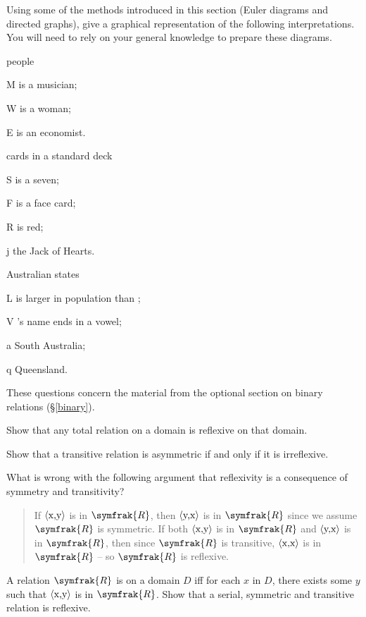 \begin{earg}
\problempart
Using some of the methods introduced in this section (Euler diagrams and directed graphs), give a graphical representation of the following interpretations. You will need to rely on your general knowledge to prepare these diagrams. \begin{earg}
	\item \begin{ekey}
		\item[\domain] people
		\item[M]  is a musician;
		\item[W]  is a woman;
		\item[E]  is an economist.
	\end{ekey}
	\item \begin{ekey}
\item[\domain] cards in a standard deck
\item[S]  is a seven;
\item[F]  is a face card;
\item[R]  is red;
\item[j] the Jack of Hearts.
	\end{ekey}
	\item \begin{ekey}
		\item[\domain] Australian states
		\item[L]  is larger in population than \gap{2};
		\item[V] 's name ends in a vowel;
		\item[a] South Australia;
		\item[q] Queensland.
	\end{ekey}
\end{earg}

\problempart These questions concern the material from the optional section on binary relations (§\ref{binary}). \begin{earg} \item Show that any total relation on a domain is reflexive on that domain.
\item Show that a transitive relation is asymmetric if and only if it is irreflexive.
\item What is wrong with the following argument that reflexivity is a consequence of symmetry and transitivity? \begin{quote}
	If $\mbox{\ensuremath{\mathopen{\langle}}x,y\ensuremath{\mathclose{\rangle}}}$ is in $\symfrak{R}$, then $\mbox{\ensuremath{\mathopen{\langle}}y,x\ensuremath{\mathclose{\rangle}}}$ is in $\symfrak{R}$ since we assume $\symfrak{R}$ is symmetric. If both $\mbox{\ensuremath{\mathopen{\langle}}x,y\ensuremath{\mathclose{\rangle}}}$ is in $\symfrak{R}$ and $\mbox{\ensuremath{\mathopen{\langle}}y,x\ensuremath{\mathclose{\rangle}}}$ is in $\symfrak{R}$, then since $\symfrak{R}$ is transitive, $\mbox{\ensuremath{\mathopen{\langle}}x,x\ensuremath{\mathclose{\rangle}}}$ is in $\symfrak{R}$ – so $\symfrak{R}$ is reflexive. 
\end{quote}
\item A relation $\symfrak{R}$ is  on a domain $D$ iff for each $x$ in $D$, there exists some $y$ such that $\mbox{\ensuremath{\mathopen{\langle}}x,y\ensuremath{\mathclose{\rangle}}}$ is in $\symfrak{R}$.  Show that a serial, symmetric and transitive relation is reflexive. 
\end{earg}



\end{earg}
